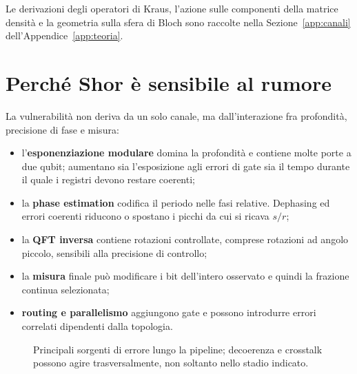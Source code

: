 \begin{onehalfspace}
Le derivazioni degli operatori di Kraus, l'azione sulle componenti della matrice densità e la geometria sulla sfera di Bloch sono raccolte nella Sezione~\ref{app:canali} dell'Appendice~\ref{app:teoria}.

\section{Perché Shor è sensibile al rumore}

La vulnerabilità non deriva da un solo canale, ma dall'interazione fra profondità, precisione di fase e misura:
\begin{itemize}
    \item l'\textbf{esponenziazione modulare} domina la profondità e contiene molte porte a due qubit; aumentano sia l'esposizione agli errori di gate sia il tempo durante il quale i registri devono restare coerenti;
    \item la \textbf{phase estimation} codifica il periodo nelle fasi relative. Dephasing ed errori coerenti riducono o spostano i picchi da cui si ricava $s/r$;
    \item la \textbf{QFT inversa} contiene rotazioni controllate, comprese rotazioni ad angolo piccolo, sensibili alla precisione di controllo;
    \item la \textbf{misura} finale può modificare i bit dell'intero osservato e quindi la frazione continua selezionata;
    \item \textbf{routing e parallelismo} aggiungono gate e possono introdurre errori correlati dipendenti dalla topologia.
\end{itemize}

\begin{figure}[!htbp]
\centering
{}
\caption[Localizzazione del rumore nella pipeline di Shor]{Principali sorgenti di errore lungo la pipeline; decoerenza e crosstalk possono agire trasversalmente, non soltanto nello stadio indicato.}
\label{fig:errori_shor}
\end{figure}


\end{onehalfspace}
